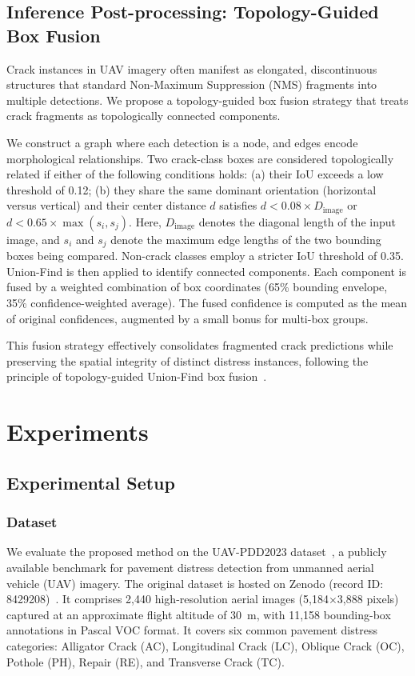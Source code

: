 \documentclass{ieeeaccess}
\begin{document}
\subsection{Inference Post-processing: Topology-Guided Box Fusion}

Crack instances in UAV imagery often manifest as elongated, discontinuous structures that standard Non-Maximum Suppression (NMS) fragments into multiple detections. We propose a topology-guided box fusion strategy that treats crack fragments as topologically connected components.

We construct a graph where each detection is a node, and edges encode morphological relationships. Two crack-class boxes are considered topologically related if either of the following conditions holds: (a) their IoU exceeds a low threshold of 0.12; (b) they share the same dominant orientation (horizontal versus vertical) and their center distance $d$ satisfies $d < 0.08 \times D_{\text{image}}$ or $d < 0.65 \times \max(s_i, s_j)$. Here, $D_{\text{image}}$ denotes the diagonal length of the input image, and $s_i$ and $s_j$ denote the maximum edge lengths of the two bounding boxes being compared. Non-crack classes employ a stricter IoU threshold of 0.35. Union-Find is then applied to identify connected components. Each component is fused by a weighted combination of box coordinates (65\% bounding envelope, 35\% confidence-weighted average). The fused confidence is computed as the mean of original confidences, augmented by a small bonus for multi-box groups.

This fusion strategy effectively consolidates fragmented crack predictions while preserving the spatial integrity of distinct distress instances, following the principle of topology-guided Union-Find box fusion~\cite{pantojarosero2022topoloss}.

\section{Experiments}
\label{sec:exp}

\subsection{Experimental Setup}

\subsubsection{Dataset}
We evaluate the proposed method on the UAV-PDD2023 dataset~\cite{yan2023uavpdd2023}, a publicly available benchmark for pavement distress detection from unmanned aerial vehicle (UAV) imagery. The original dataset is hosted on Zenodo (record ID: 8429208)~\cite{yan2023uavpdd2023}. It comprises 2,440 high-resolution aerial images (5,184$\times$3,888 pixels) captured at an approximate flight altitude of 30~m, with 11,158 bounding-box annotations in Pascal VOC format. It covers six common pavement distress categories: Alligator Crack (AC), Longitudinal Crack (LC), Oblique Crack (OC), Pothole (PH), Repair (RE), and Transverse Crack (TC).
\end{document}
